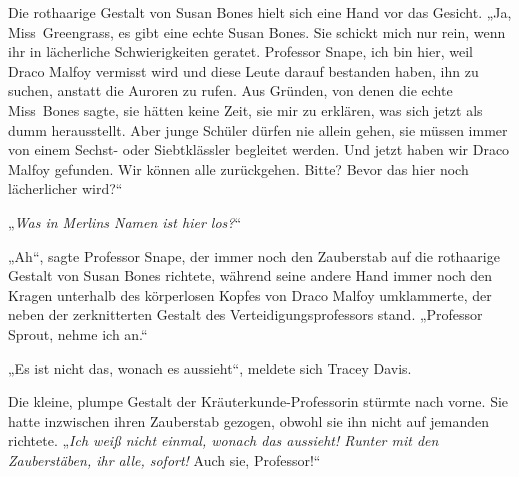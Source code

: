 Die rothaarige Gestalt von Susan Bones hielt sich eine Hand vor das Gesicht.
„Ja, Miss~Greengrass, es gibt eine echte Susan Bones. Sie schickt mich nur rein, wenn ihr in lächerliche Schwierigkeiten geratet. Professor Snape, ich bin hier, weil Draco Malfoy vermisst wird und diese Leute darauf bestanden haben, ihn zu suchen, anstatt die Auroren zu rufen. Aus Gründen, von denen die echte Miss~Bones sagte, sie hätten keine Zeit, sie mir zu erklären, was sich jetzt als dumm herausstellt. Aber junge Schüler dürfen nie allein gehen, sie müssen immer von einem Sechst- oder Siebtklässler begleitet werden. Und jetzt haben wir Draco Malfoy gefunden. Wir können alle zurückgehen. Bitte? Bevor das hier noch lächerlicher wird?“

„\emph{Was in Merlins Namen ist hier los?}“

„Ah“, sagte Professor Snape, der immer noch den Zauberstab auf die rothaarige Gestalt von Susan Bones richtete, während seine andere Hand immer noch den Kragen unterhalb des körperlosen Kopfes von Draco Malfoy umklammerte, der neben der zerknitterten Gestalt des Verteidigungsprofessors stand.
„Professor Sprout, nehme ich an.“

„Es ist nicht das, wonach es aussieht“, meldete sich Tracey Davis.

Die kleine, plumpe Gestalt der Kräuterkunde-Professorin stürmte nach vorne. Sie hatte inzwischen ihren Zauberstab gezogen, obwohl sie ihn nicht auf jemanden richtete.
„\emph{Ich weiß nicht einmal, wonach das aussieht! \emph{Runter mit den Zauberstäben}, ihr alle, sofort!} Auch sie, Professor!“

